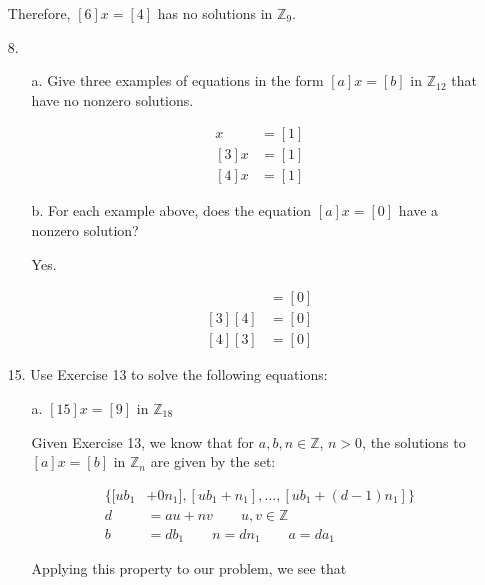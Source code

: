 \documentclass{article}
\begin{document}
\begin{enumerate}
			Therefore, $[6]x = [4]$ has no solutions in $\mathbb{Z}_9$.
		\item [8.]
			\begin{enumerate}
				\item [a.] Give three examples of equations in the form $[a]x = [b]$ in 
						$\mathbb{Z}_{12}$ that have no nonzero solutions.

					\begin{align}
						[2]x & = [1] \\
						[3]x & = [1] \\
						[4]x & = [1]
					\end{align}

				\item [b.] For each example above, does the equation $[a]x = [0]$ have a nonzero 
						solution?

					Yes.

					\begin{align*}
						[2][6] & = [0] \\
						[3][4] & = [0] \\
						[4][3] & = [0]
					\end{align*}

			\end{enumerate}
		\item [15.] Use Exercise 13 to solve the following equations:
			\begin{enumerate}
				\item [a.] $[15]x = [9]$ in $\mathbb{Z}_{18}$

					Given Exercise 13, we know that for $a, b, n \in \mathbb{Z}$, $n > 0$, the 
					solutions to $[a]x = [b]$ in $\mathbb{Z}_n$ are given by the set:

					\begin{align*}
						\lbrace [ub_1 & + 0n_1], [ub_1 + n_1], \dots, [ub_1 + (d - 1)n_1] \rbrace \\
						d & = au + nv \qquad u, v \in \mathbb{Z} \\
						b & = db_1 \qquad n = dn_1 \qquad a = da_1
					\end{align*} 

					Applying this property to our problem, we see that 


\end{enumerate}
\end{enumerate}
\end{document}
